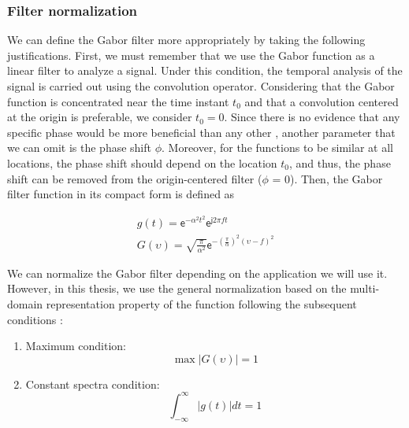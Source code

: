 \subsubsection{Filter normalization} \label{subsec:filter_normalization}
We can define the Gabor filter more appropriately by taking the following justifications. First, we must remember that we use the Gabor function as a linear filter to analyze a signal. Under this condition, the temporal analysis of the signal is carried out using the convolution operator. Considering that the Gabor function is concentrated near the time instant $t_0$ and that a convolution centered at the origin is preferable, we consider $t_0 = 0$. Since there is no evidence that any specific phase would be more beneficial than any other \citep{Liu.Koga.ea:ICDAR:2005}, another parameter that we can omit is the phase shift $\phi$. Moreover, for the functions to be similar at all locations, the phase shift should depend on the location $t_0$, and thus, the phase shift can be removed from the origin-centered filter ($\phi$ = 0). Then, the Gabor filter function in its compact form is defined as 

\begin{equation}\label{eq:gabor_function_1d_timefreq_compact}
    \begin{gathered}
         g(t) =  \mathsf{e}^{-\alpha^2 t^2} \mathsf{e}^{\mathsf{j} 2 \pi f t } \\
         G(\upsilon) =  \sqrt{\frac{\pi}{\alpha^2}} \mathsf{e}^{-\left(\frac{\pi}{\alpha}\right) ^{2} (\upsilon-f)^2} 
     \end{gathered}
\end{equation}

We can normalize the Gabor filter depending on the application we will use it. However, in this thesis, we use the general normalization based on the multi-domain representation property of the function following the subsequent conditions \citep{Boukerroui.Noble.ea:JMIV:2004}:

\begin{enumerate}
    \item Maximum condition:
        \begin{equation}\label{eq:maximun_condition}
            \max{|G(\upsilon)|} = 1
        \end{equation}
    \item Constant spectra condition:
        \begin{equation}\label{eq:constant_spectrum_condition}
            \int_{-\infty}^{\infty} |g(t)| dt = 1
        \end{equation}        
\end{enumerate}

